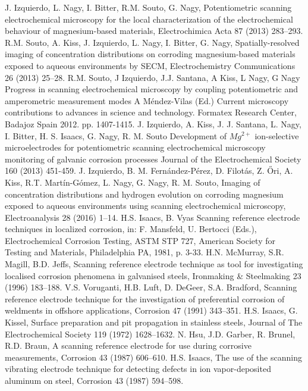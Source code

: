 \documentclass[3p]{elsarticle}
\begin{document}
\begin{thebibliography}{5}
J. Izquierdo, L. Nagy, I. Bitter, R.M. Souto, G. Nagy, 
Potentiometric scanning electrochemical microscopy for the local characterization of the electrochemical behaviour of magnesium-based materials, Electrochimica Acta 87 (2013) 283–293.
R.M. Souto, A. Kiss, J. Izquierdo, L. Nagy, I. Bitter, G. Nagy, Spatially-resolved imaging of concentration distributions on corroding magnesium-based materials exposed to aqueous environments by SECM, Electrochemistry Communications 26 (2013) 25–28.
R.M. Souto, J Izquierdo, J.J. Santana, A Kiss, L Nagy, G Nagy 
Progress in scanning electrochemical microscopy by coupling potentiometric and amperometric measurement modes
A Méndez-Vilas (Ed.)
Current microscopy contributions to advances in science and technology. Formatex Research Center, Badajoz Spain 2012. pp. 1407-1415.
J. Izquierdo, A. Kiss, J. J. Santana, L. Nagy, I. Bitter, H. S. Isaacs, G. Nagy, R. M. Souto
Development of $Mg^{2+}$ ion-selective microelectrodes for potentiometric scanning electrochemical microscopy monitoring of galvanic corrosion processes
Journal of the Electrochemical Society  160 (2013) 451-459. 
J. Izquierdo, B. M. Fernández-Pérez, D. Filotás, Z. Őri, A. Kiss, R.T. Martín-Gómez, L. Nagy, G. Nagy, R. M. Souto, Imaging of concentration distributions and hydrogen evolution on corroding magnesium exposed to aqueous environments using scanning electrochemical microscopy, Electroanalysis 28 (2016) 1–14.
H.S. Isaacs, B. Vyas Scanning reference electrode techniques in localized corrosion, in: F. Mansfeld, U. Bertocci (Eds.), Electrochemical Corrosion Testing, ASTM STP 727, American Society for Testing and Materials, Philadelphia PA, 1981, p. 3-33.
H.N. McMurray, S.R. Magill, B.D. Jeffs, Scanning reference electrode technique as tool for investigating localised corrosion phenomena in galvanised steels, Ironmaking \& Steelmaking 23 (1996) 183–188.
V.S. Voruganti, H.B. Luft, D. DeGeer, S.A. Bradford, Scanning reference electrode technique for the investigation of preferential corrosion of weldments in offshore applications, Corrosion 47 (1991) 343–351.
H.S. Isaacs, G. Kissel, Surface preparation and pit propagation in stainless steels, Journal of The Electrochemical Society 119 (1972) 1628–1632.
N. Hsu, J.D. Garber, R. Brunel, R.D. Braun, A scanning reference electrode for use during corrosive measurements, Corrosion 43 (1987) 606–610.
H.S. Isaacs, The use of the scanning vibrating electrode technique for detecting defects in ion vapor-deposited aluminum on steel, Corrosion 43 (1987) 594–598.   


\end{thebibliography}
\end{document}
